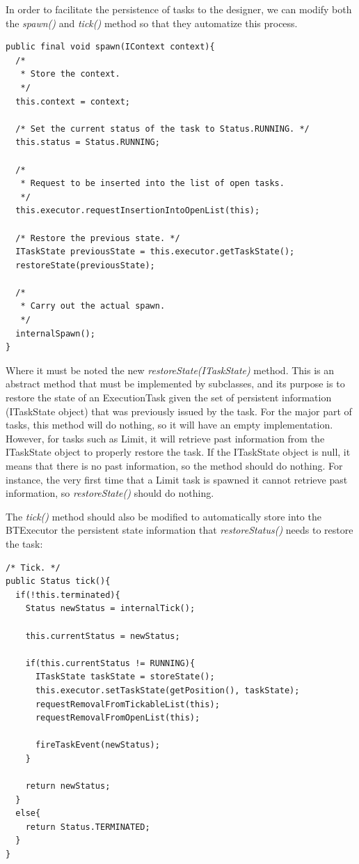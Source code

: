 \documentclass[a4paper,10pt]{article}
\begin{document}
In order to facilitate the persistence of tasks to the designer, we can modify both the \textit{spawn()} and \textit{tick()} method so that they automatize this process. 

\begin{verbatim}
public final void spawn(IContext context){
  /*
   * Store the context.
   */
  this.context = context;

  /* Set the current status of the task to Status.RUNNING. */
  this.status = Status.RUNNING;

  /*
   * Request to be inserted into the list of open tasks.
   */
  this.executor.requestInsertionIntoOpenList(this);
  
  /* Restore the previous state. */
  ITaskState previousState = this.executor.getTaskState();
  restoreState(previousState);

  /*
   * Carry out the actual spawn.
   */
  internalSpawn();
}
\end{verbatim}

Where it must be noted the new \textit{restoreState(ITaskState)} method. This is an abstract method that must be implemented by subclasses, and its purpose is to restore the state of an ExecutionTask given the set of persistent information (ITaskState object) that was previously issued by the task. For the major part of tasks, this method will do nothing, so it will have an empty implementation. However, for tasks such as Limit, it will retrieve past information from the ITaskState object to properly restore the task. If the ITaskState object is null, it means that there is no past information, so the method should do nothing. For instance, the very first time that a Limit task is spawned it cannot retrieve past information, so \textit{restoreState()} should do nothing.

The \textit{tick()} method should also be modified to automatically store into the BTExecutor the persistent state information that \textit{restoreStatus()} needs to restore the task:

\begin{verbatim}
/* Tick. */
public Status tick(){
  if(!this.terminated){
    Status newStatus = internalTick();

    this.currentStatus = newStatus;

    if(this.currentStatus != RUNNING){
      ITaskState taskState = storeState();
      this.executor.setTaskState(getPosition(), taskState);
      requestRemovalFromTickableList(this);
      requestRemovalFromOpenList(this);

      fireTaskEvent(newStatus);
    }  

    return newStatus;
  }
  else{
    return Status.TERMINATED;
  }
}
\end{verbatim}
\end{document}
